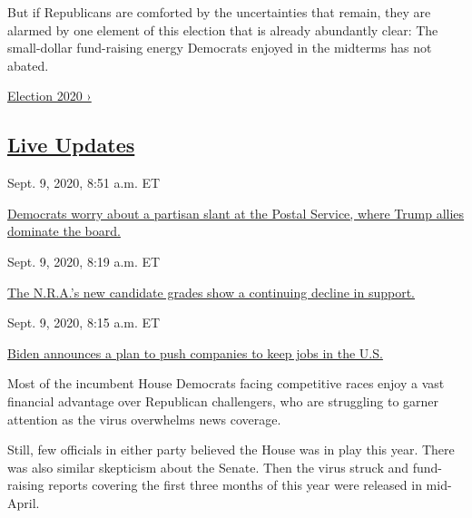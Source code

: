 But if Republicans are comforted by the uncertainties that remain, they
are alarmed by one element of this election that is already abundantly
clear: The small-dollar fund-raising energy Democrats enjoyed in the
midterms has not abated.

\href{https://www.nytimes3xbfgragh.onion/news-event/2020-election}{Election
2020 ›}

\hypertarget{live-updates}{%
\subsection{\texorpdfstring{\href{https://www.nytimes3xbfgragh.onion/live/2020/09/09/us/trump-vs-biden}{Live
Updates}}{Live Updates}}\label{live-updates}}

\href{https://www.nytimes3xbfgragh.onion/live/2020/09/09/us/trump-vs-biden\#democrats-worry-about-a-partisan-slant-at-the-postal-service-where-trump-allies-dominate-the-board}{}

Sept. 9, 2020, 8:51 a.m. ET

\href{https://www.nytimes3xbfgragh.onion/live/2020/09/09/us/trump-vs-biden\#democrats-worry-about-a-partisan-slant-at-the-postal-service-where-trump-allies-dominate-the-board}{Democrats
worry about a partisan slant at the Postal Service, where Trump allies
dominate the
board.}\href{https://www.nytimes3xbfgragh.onion/live/2020/09/09/us/trump-vs-biden\#the-nras-new-candidate-grades-show-a-continuing-decline-in-support}{}

Sept. 9, 2020, 8:19 a.m. ET

\href{https://www.nytimes3xbfgragh.onion/live/2020/09/09/us/trump-vs-biden\#the-nras-new-candidate-grades-show-a-continuing-decline-in-support}{The
N.R.A.'s new candidate grades show a continuing decline in
support.}\href{https://www.nytimes3xbfgragh.onion/live/2020/09/09/us/trump-vs-biden\#biden-announces-a-plan-to-push-companies-to-keep-jobs-in-the-us}{}

Sept. 9, 2020, 8:15 a.m. ET

\href{https://www.nytimes3xbfgragh.onion/live/2020/09/09/us/trump-vs-biden\#biden-announces-a-plan-to-push-companies-to-keep-jobs-in-the-us}{Biden
announces a plan to push companies to keep jobs in the U.S.}

Most of the incumbent House Democrats facing competitive races enjoy a
vast financial advantage over Republican challengers, who are struggling
to garner attention as the virus overwhelms news coverage.

Still, few officials in either party believed the House was in play this
year. There was also similar skepticism about the Senate. Then the virus
struck and fund-raising reports covering the first three months of this
year were released in mid-April.


